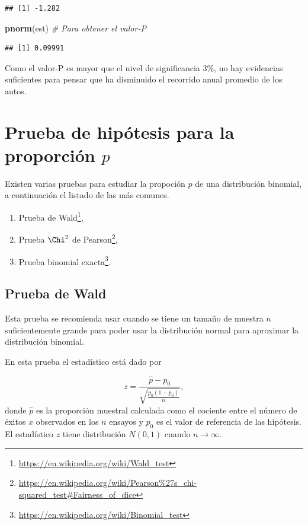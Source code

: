 \documentclass[10pt,]{krantz}
\makeatletter
\newenvironment{Shaded}{\begin{snugshade}}{\end{snugshade}}
\newcommand{\KeywordTok}[1]{\textcolor[rgb]{0.13,0.29,0.53}{\textbf{#1}}}
\newcommand{\CommentTok}[1]{\textcolor[rgb]{0.56,0.35,0.01}{\textit{#1}}}
\newcommand{\NormalTok}[1]{#1}
\providecommand{\tightlist}{%
  \setlength{\itemsep}{0pt}\setlength{\parskip}{0pt}}
\renewcommand{\href}[2]{#2\footnote{\url{#1}}}
\newenvironment{kframe}{%
\medskip{}
\setlength{\fboxsep}{.8em}
 \def\at@end@of@kframe{}%
 \ifinner\ifhmode%
  \def\at@end@of@kframe{\end{minipage}}%
  \begin{minipage}{\columnwidth}%
 \fi\fi%
 \def\FrameCommand##1{\hskip\@totalleftmargin \hskip-\fboxsep
 \colorbox{shadecolor}{##1}\hskip-\fboxsep
     \hskip-\linewidth \hskip-\@totalleftmargin \hskip\columnwidth}%
 \MakeFramed {\advance\hsize-\width
   \@totalleftmargin\z@ \linewidth\hsize
   \@setminipage}}%
 {\par\unskip\endMakeFramed%
 \at@end@of@kframe}
\renewenvironment{Shaded}{\begin{kframe}}{\end{kframe}}
\makeatother
\begin{document}
\begin{verbatim}
## [1] -1.282
\end{verbatim}

\begin{Shaded}
\begin{Highlighting}[]
\KeywordTok{pnorm}\NormalTok{(est)  }\CommentTok{# Para obtener el valor-P}
\end{Highlighting}
\end{Shaded}

\begin{verbatim}
## [1] 0.09991
\end{verbatim}

Como el valor-P es mayor que el nivel de significancia 3\%, no hay
evidencias suficientes para pensar que ha disminuido el recorrido anual
promedio de los autos.

\section{\texorpdfstring{Prueba de hipótesis para la proporción
\(p\)}{Prueba de hipótesis para la proporción p}}\label{prueba-de-hipotesis-para-la-proporcion-p}

Existen varias pruebas para estudiar la propoción \(p\) de una
distribución binomial, a continuación el listado de las más comunes.

\begin{enumerate}
\def\labelenumi{\arabic{enumi}.}
\tightlist
\item
  Prueba de \href{https://en.wikipedia.org/wiki/Wald_test}{Wald},
\item
  Prueba \(\Chi^2\) de
  \href{https://en.wikipedia.org/wiki/Pearson\%27s_chi-squared_test\#Fairness_of_dice}{Pearson},
\item
  Prueba \href{https://en.wikipedia.org/wiki/Binomial_test}{binomial
  exacta}.
\end{enumerate}

\subsection{Prueba de Wald}\label{prueba-de-wald}

Esta prueba se recomienda usar cuando se tiene un tamaño de muestra
\(n\) suficientemente grande para poder usar la distribución normal para
aproximar la distribución binomial.

En esta prueba el estadístico está dado por

\[z=\frac{\hat{p}-p_0}{\sqrt{\frac{p_0(1-p_0)}{n}}},\] donde \(\hat{p}\)
es la proporción muestral calculada como el cociente entre el número de
éxitos \(x\) observados en los \(n\) ensayos y \(p_0\) es el valor de
referencia de las hipótesis. El estadístico \(z\) tiene distribución
\(N(0, 1)\) cuando \(n \to \infty\).
\end{document}
